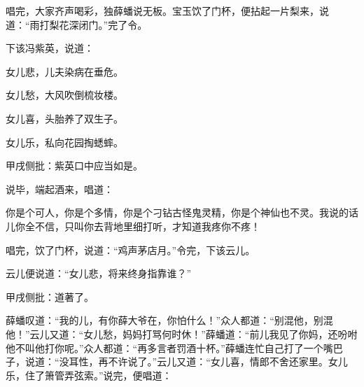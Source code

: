 \begin{parag}
    唱完，大家齐声喝彩，独薛蟠说无板。宝玉饮了门杯，便拈起一片梨来，说道：“雨打梨花深闭门。”完了令。
\end{parag}


\begin{parag}
    下该冯紫英，说道：
\end{parag}
\begin{poem}

    \begin{pl}

        女儿悲，儿夫染病在垂危。
    \end{pl}
    \begin{pl}

        女儿愁，大风吹倒梳妆楼。
    \end{pl}
    \begin{pl}

        女儿喜，头胎养了双生子。
    \end{pl}
    \begin{pl}

        女儿乐，私向花园掏蟋蟀。    \end{pl}\begin{note}甲戌侧批：紫英口中应当如是。\end{note}

\end{poem}


\begin{parag}
    说毕，端起酒来，唱道：
\end{parag}


\begin{poem}
    \begin{pl}
        你是个可人，你是个多情，你是个刁钻古怪鬼灵精，你是个神仙也不灵。我说的话儿你全不信，只叫你去背地里细打听，才知道我疼你不疼！
    \end{pl}
\end{poem}

\begin{parag}
    唱完，饮了门杯，说道：“鸡声茅店月。”令完，下该云儿。
\end{parag}


\begin{parag}
    云儿便说道：“女儿悲，将来终身指靠谁？”\begin{note}甲戌侧批：道著了。\end{note}薛蟠叹道：“我的儿，有你薛大爷在，你怕什么！”众人都道：“别混他，别混他！”云儿又道：“女儿愁，妈妈打骂何时休！”薛蟠道：“前儿我见了你妈，还吩咐他不叫他打你呢。”众人都道：“再多言者罚酒十杯。”薛蟠连忙自己打了一个嘴巴子，说道：“没耳性，再不许说了。”云儿又道：“女儿喜，情郎不舍还家里。女儿乐，住了箫管弄弦索。”说完，便唱道：
\end{parag}


